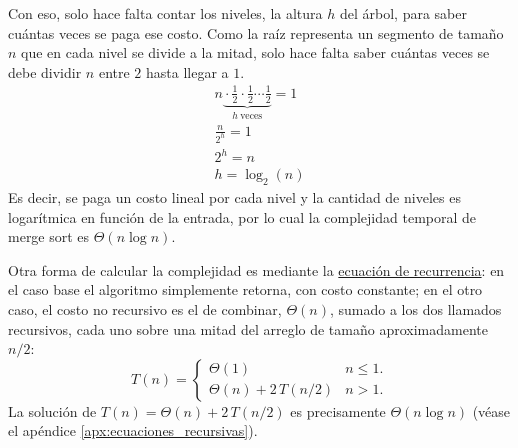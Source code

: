 Con eso, solo hace falta contar los niveles, la altura \(h\) del árbol, para saber cuántas veces se paga ese costo. Como la raíz representa un segmento de tamaño \(n\) que en cada nivel se divide a la mitad, solo hace falta saber cuántas veces se debe dividir \(n\) entre \(2\) hasta llegar a \(1\).
\begin{gather*}
  n \underbrace{{} \cdot \frac{1}{2} \cdot \frac{1}{2} \cdots \frac{1}{2}}_{h \ \text{veces}} = 1 \\
  \frac{n}{2^h} = 1 \\
  2^h = n \\
  h = \log_2(n)
\end{gather*}
Es decir, se paga un costo lineal por cada nivel y la cantidad de niveles es logarítmica en función de la entrada, por lo cual la complejidad temporal de merge sort es \(\Theta(n \log n)\).

Otra forma de calcular la complejidad es mediante la \hyperref[sec:complejidad-temporal-recursion]{ecuación de recurrencia}: en el caso base el algoritmo simplemente retorna, con costo constante; en el otro caso, el costo no recursivo es el de combinar, \(\Theta(n)\), sumado a los dos llamados recursivos, cada uno sobre una mitad del arreglo de tamaño aproximadamente \(n/2\):
\[
T(n) =
\begin{cases}
  \Theta(1) & n \le 1. \\
  \Theta(n) + 2\,T(n/2) & n > 1.
\end{cases}
\]
La solución de \(T(n) = \Theta(n) + 2\,T(n/2)\) es precisamente \(\Theta(n \log n)\) (véase el apéndice \ref{apx:ecuaciones_recursivas}).

